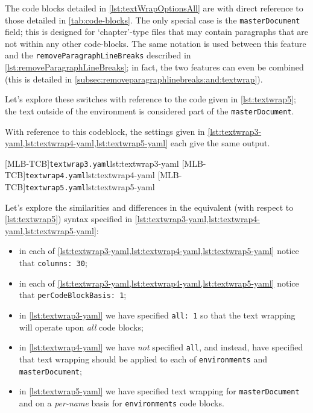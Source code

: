 	The code blocks detailed in \cref{lst:textWrapOptionsAll} are with direct reference to
	those detailed in \vref{tab:code-blocks}. The only special case is the
	\texttt{masterDocument} field; this is designed for `chapter'-type files that may
	contain paragraphs that are not within any other code-blocks. The same notation is used
	between this feature and the \texttt{removeParagraphLineBreaks} described in
	\vref{lst:removeParagraphLineBreaks}; in fact, the two features can even be combined (this is
	detailed in \vref{subsec:removeparagraphlinebreaks:and:textwrap}).

	Let's explore these switches with reference to the code given in
	\cref{lst:textwrap5}; the text outside of the environment is considered part of
	the \texttt{masterDocument}.

	\begin{widepage}
	\end{widepage}

	With reference to this codeblock, the settings given in \cref{lst:textwrap3-yaml,lst:textwrap4-yaml,lst:textwrap5-yaml} each
	give the same output.

        \begin{cmhtcbraster}[raster columns=3,
            raster left skip=-3.5cm,
                             raster right skip=-2cm,
                             raster column skip=.03\linewidth]
			{\texttt{textwrap3.yaml}}{lst:textwrap3-yaml}
			{\texttt{textwrap4.yaml}}{lst:textwrap4-yaml}
			{\texttt{textwrap5.yaml}}{lst:textwrap5-yaml}
        \end{cmhtcbraster}

	Let's explore the similarities and differences in the equivalent (with respect to
	\cref{lst:textwrap5}) syntax specified in \cref{lst:textwrap3-yaml,lst:textwrap4-yaml,lst:textwrap5-yaml}:
	\begin{itemize}
		\item in each of \cref{lst:textwrap3-yaml,lst:textwrap4-yaml,lst:textwrap5-yaml} notice that \texttt{columns: 30};
		\item in each of \cref{lst:textwrap3-yaml,lst:textwrap4-yaml,lst:textwrap5-yaml} notice that \texttt{perCodeBlockBasis: 1};
		\item in \cref{lst:textwrap3-yaml} we have specified \texttt{all: 1} so that the
		      text wrapping will operate upon \emph{all} code blocks;
		\item in \cref{lst:textwrap4-yaml} we have \emph{not} specified
		      \texttt{all}, and instead, have specified that text wrapping should be
		      applied to each of \texttt{environments} and \texttt{masterDocument};
		\item in \cref{lst:textwrap5-yaml} we have specified text wrapping for
		      \texttt{masterDocument} and on a \emph{per-name} basis for
		      \texttt{environments} code blocks.
	\end{itemize}

